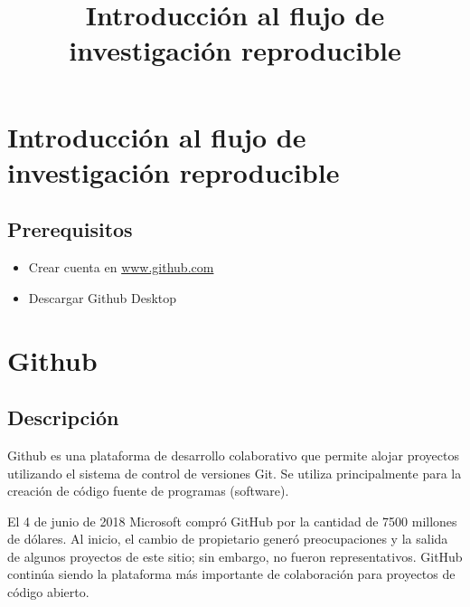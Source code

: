 \documentclass[
  letterpaper,
  DIV=11,
  numbers=noendperiod]{scrartcl}
\title{Introducción al flujo de investigación reproducible}
\author{}
\date{}
\begin{document}
\maketitle


\section{Introducción al flujo de investigación
reproducible}\label{introducciuxf3n-al-flujo-de-investigaciuxf3n-reproducible}

\subsection{Prerequisitos}\label{prerequisitos}

\begin{itemize}
\item
  Crear cuenta en \url{www.github.com}
\item
  Descargar Github Desktop
\end{itemize}

\section{Github}\label{github}

\subsection{Descripción}\label{descripciuxf3n}

Github es una plataforma de desarrollo colaborativo que permite alojar
proyectos utilizando el sistema de control de versiones Git. Se utiliza
principalmente para la creación de código fuente de programas
(software).

\begin{tcolorbox}[enhanced jigsaw, opacitybacktitle=0.6, colframe=quarto-callout-note-color-frame, breakable, toprule=.15mm, bottomrule=.15mm, toptitle=1mm, colback=white, bottomtitle=1mm, rightrule=.15mm, title=\textcolor{quarto-callout-note-color}{\faInfo}\hspace{0.5em}{Note}, leftrule=.75mm, coltitle=black, opacityback=0, titlerule=0mm, arc=.35mm, left=2mm, colbacktitle=quarto-callout-note-color!10!white]

El 4 de junio de 2018 Microsoft compró GitHub por la cantidad de 7500
millones de dólares. Al inicio, el cambio de propietario generó
preocupaciones y la salida de algunos proyectos de este sitio; sin
embargo, no fueron representativos. GitHub continúa siendo la plataforma
más importante de colaboración para proyectos de código abierto.

\end{tcolorbox}
\end{document}

